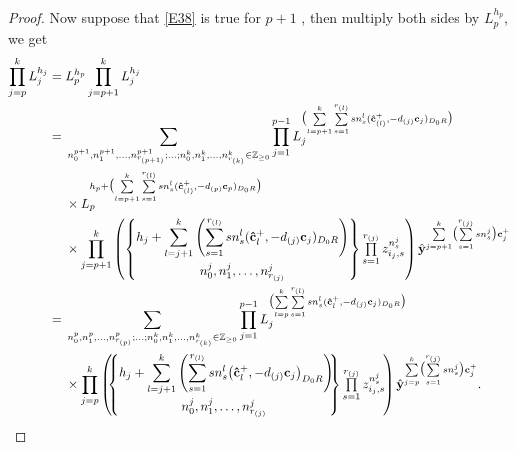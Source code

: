 \documentclass[10pt,a4paper]{amsart}
\newcommand{\Z}{\mathbb{Z}}
\numberwithin{equation}{section}
\begin{document}
\begin{proof}
 Now suppose that \eqref{E38} is true for $p+1$ , then multiply both sides by $L_p^{h_p}$, we get
 \begin{align*}
 \prod\limits_{j=p}^{k}L_j^{h_j}
 ={}&L_p^{h_p}\prod\limits_{j=p+1}^{k}L_j^{h_j} \\
={}&\sum_{n_0^{p+1},n_{1}^{p+1},\dots,n_{r_{(p+1)}}^{p+1};\dots;n_0^{k},n_{1}^{k},\dots,n_{r_{(k)}}^k\in \Z_{\geq 0} }\prod_{j=1}^{p-1}L_j^{\bigl(\sum\limits_{l=p+1}^{k}\sum\limits_{s=1}^{r_{(l)}}sn_{s}^{l}(\mathbf{\hat{c}}_{(l)}^+,-d_{(j)}\mathbf{c}_{j})_{D_0R}\bigr)} \\
&\times L_{p}^{h_{p}+\bigl(\sum\limits_{l=p+1}^{k}\sum\limits_{s=1}^{r_{(l)}}sn_{s}^{l}(\mathbf{\hat{c}}_{(l)}^+,-d_{(p)}\mathbf{c}_{p})_{D_0R}\bigr)} \\
&\times \prod\limits_{j=p+1}^{k}\begin{pmatrix}
 \begin{Bmatrix}\displaystyle h_j+\sum\limits_{l=j+1}^{k}\left(\sum\limits_{s=1}^{r_{(l)}}sn_{s}^{l}(\mathbf{\hat{c}}_{l}^+,-d_{(j)}\mathbf{c}_{j})_{D_0R}\right)\vspace{1mm}\\ n_0^j,n_{1}^j,\dots,n_{r_{(j)}}^j\end{Bmatrix}\prod\limits_{s=1}^{r_{(j)}}z_{i_j,s}^{n_s^j}
\end{pmatrix}\hat{\mathbf{y}}^{\sum\limits_{j=p+1}^{k}\bigl(\sum\limits_{s=1}^{r_{(j)}}sn_s^j\bigr)\mathbf{c}_{j}^+}\\
={}&\sum_{n_0^p,n_{1}^{p},\dots,n_{r_{(p)}}^p;\dots;n_0^{k},n_{1}^{k},\dots,n_{r_{(k)}}^k\in \Z_{\geq 0} }\prod_{j=1}^{p-1}L_j^{\bigl(\sum\limits_{l=p}^{k}\sum\limits_{s=1}^{r_{(l)}}s n_{s}^{l}(\mathbf{\hat{c}}_{l}^+,-d_{(j)}\mathbf{c}_{j})_{D_0R}\bigr)} \\
&\times \prod\limits_{j=p}^{k}\begin{pmatrix}\!\!
 \begin{Bmatrix}\displaystyle h_j+\sum\limits_{l=j+1}^{k}\left(\sum\limits_{s=1}^{r_{(l)}}s n_{s}^{l}\bigl(\mathbf{\hat{c}}_{l}^+,-d_{(j)}\mathbf{c}_{j}\bigr)_{D_0R}\right)\!\!\vspace{1mm}\\ n_0^j,n_{1}^j,\dots,n_{r_{(j)}}^j\end{Bmatrix}\prod\limits_{s=1}^{r_{(j)}}z_{i_j,s}^{n_s^j}\!
\end{pmatrix}\hat{\mathbf{y}}^{\sum\limits_{j=p}^{k}\bigl(\sum\limits_{s=1}^{r_{(j)}}s n_s^j\bigr)\mathbf{c}_{j}^+}.\tag*{\qed}
 \end{align*}\renewcommand{\qed}{}
\end{proof}
\end{document}
